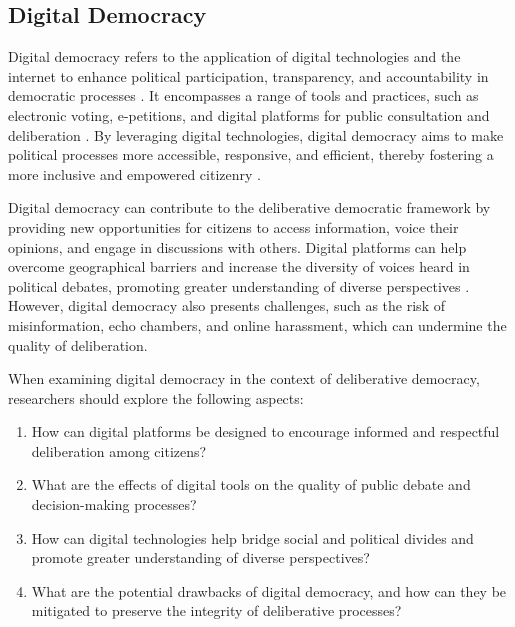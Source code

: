 \documentclass{IEEEtran}
\begin{document}


\subsection{Digital Democracy}

Digital democracy refers to the application of digital technologies and the internet to enhance political participation, transparency, and accountability in democratic processes \cite{ coleman2004democracy}. It encompasses a range of tools and practices, such as electronic voting, e-petitions, and digital platforms for public consultation and deliberation \cite{davis2005online}. By leveraging digital technologies, digital democracy aims to make political processes more accessible, responsive, and efficient, thereby fostering a more inclusive and empowered citizenry \cite{dahlberg2001extending}.

Digital democracy can contribute to the deliberative democratic framework by providing new opportunities for citizens to access information, voice their opinions, and engage in discussions with others. Digital platforms can help overcome geographical barriers and increase the diversity of voices heard in political debates, promoting greater understanding of diverse perspectives \cite{fishkin2009virtual}. However, digital democracy also presents challenges, such as the risk of misinformation, echo chambers, and online harassment, which can undermine the quality of deliberation.

When examining digital democracy in the context of deliberative democracy, researchers should explore the following aspects:

\begin{enumerate}
\item How can digital platforms be designed to encourage informed and respectful deliberation among citizens? 
\item What are the effects of digital tools on the quality of public debate and decision-making processes? 
\item How can digital technologies help bridge social and political divides and promote greater understanding of diverse perspectives?
\item What are the potential drawbacks of digital democracy, and how can they be mitigated to preserve the integrity of deliberative processes?
\end{enumerate}
\end{document}
